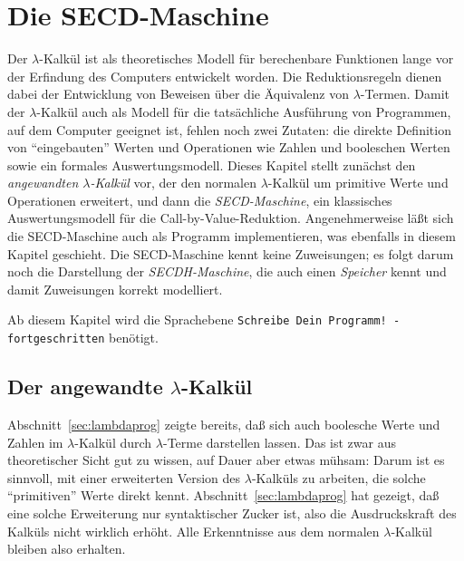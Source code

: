 
\chapter{Die SECD-Maschine}\label{cha:secd}

Der $\lambda$-Kalkül ist als theoretisches Modell für berechenbare
Funktionen lange vor der Erfindung des Computers entwickelt worden.
Die Reduktionsregeln dienen dabei der Entwicklung von Beweisen über
die Äquivalenz von $\lambda$-Termen.  Damit der $\lambda$-Kalkül auch
als Modell für die tatsächliche Ausführung von Programmen, auf dem
Computer geeignet ist, fehlen noch zwei Zutaten: die direkte
Definition von "`eingebauten"' Werten und Operationen wie Zahlen und
booleschen Werten sowie ein formales Auswertungsmodell.  Dieses
Kapitel stellt zunächst den \textit{angewandten $\lambda$-Kalkül} vor,
der den normalen $\lambda$-Kalkül um primitive Werte und Operationen
erweitert, und dann die \textit{SECD-Maschine}, ein klassisches
Auswertungsmodell für die Call-by-Value-Reduktion.  Angenehmerweise
läßt sich die SECD-Maschine auch als Programm implementieren,
was ebenfalls in diesem Kapitel geschieht.  Die SECD-Maschine
kennt keine Zuweisungen; es folgt darum noch die Darstellung der
\textit{SECDH-Maschine}, die auch einen \textit{Speicher} kennt und
damit Zuweisungen korrekt modelliert.

Ab diesem Kapitel wird die Sprachebene \texttt{Schreibe
  Dein Programm! - fortgeschritten} benötigt. 

\section{Der angewandte $\lambda$-Kalkül}

Abschnitt~\ref{sec:lambdaprog} zeigte bereits, daß sich auch boolesche
Werte und Zahlen im $\lambda$-Kalkül durch $\lambda$-Terme darstellen
lassen.  Das ist zwar aus theoretischer Sicht gut zu wissen, auf Dauer
aber etwas mühsam: Darum ist es sinnvoll, mit einer erweiterten
Version des $\lambda$-Kalküls zu arbeiten, die solche "`primitiven"'
Werte direkt kennt.  Abschnitt~\ref{sec:lambdaprog} hat gezeigt,
daß eine solche Erweiterung nur syntaktischer Zucker ist,
also die Ausdruckskraft des Kalküls nicht wirklich erhöht.  Alle
Erkenntnisse aus dem normalen $\lambda$-Kalkül bleiben also erhalten.

